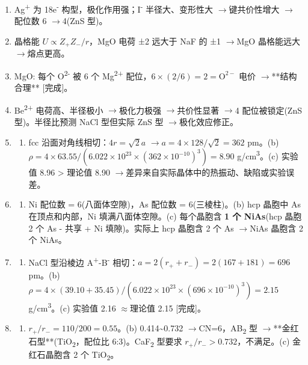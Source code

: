 \documentclass[a4paper,11pt]{ctexart}
\providecommand{\tightlist}{\setlength{\itemsep}{0pt}\setlength{\parskip}{0pt}}
\newcommand{\箭}{\ensuremath{\rightarrow}}
\newcommand{\左箭}{\ensuremath{\leftarrow}}
\newcommand{\上箭}{\ensuremath{\uparrow}}
\newcommand{\下箭}{\ensuremath{\downarrow}}
\newcommand{\衡}{\ensuremath{\rightleftharpoons}}
\newcommand{\双箭}{\ensuremath{\leftrightarrow}}
\newcommand{\约等于}{\ensuremath{\approx}}
\newcommand{\小于等于}{\ensuremath{\leq}}
\newcommand{\大于等于}{\ensuremath{\geq}}
\newcommand{\不等于}{\ensuremath{\neq}}
\newcommand{\西格马}{\ensuremath{\sigma}}
\newcommand{\派}{\ensuremath{\pi}}
\begin{document}
\begin{enumerate}
\item
  Ag\textsuperscript{+} 为 18e\textsuperscript{-} 构型，极化作用强；I\textsuperscript{-} 半径大、变形性大 \箭 键共价性增大 \箭 配位数 6 \箭 4(ZnS 型)。
\item
  晶格能 \(U \propto Z_+Z_-/r\)，MgO 电荷 ±2 远大于 NaF 的 ±1 \箭 MgO 晶格能远大 \箭 熔点更高。
\item
  MgO: 每个 O\textsuperscript{2-} 被 6 个 Mg\textsuperscript{2+} 配位，\(6\times(2/6) = 2 = \mathrm{O^{2-}}\) 电价 \箭 **结构合理** {[}完成{]}。
\item
  Be\textsuperscript{2+} 电荷高、半径极小 \箭 极化力极强 \箭 共价性显著 \箭 4 配位被锁定(ZnS 型)。半径比预测 NaCl 型但实际 ZnS 型 \箭 极化效应修正。
\item
  \begin{enumerate}
  \def\labelenumii{(\alph{enumii})}
  \tightlist
  \item
    fcc 沿面对角线相切：\(4r = \sqrt{2}a\) \箭 \(a = 4\times128/\sqrt{2} = 362\) pm。(b) \(\rho = 4\times63.55/(6.022\times10^{23}\times(362\times10^{-10})^3) = 8.90\) g/cm\textsuperscript{3}。(c) 实验值 8.96 \textgreater{} 理论值 8.90 \箭 差异来自实际晶体中的热振动、缺陷或实验误差。
  \end{enumerate}
\item
  \begin{enumerate}
  \def\labelenumii{(\alph{enumii})}
  \tightlist
  \item
    Ni 配位数 = 6(八面体空隙)，As 配位数 = 6(三棱柱)。(b) hcp 晶胞中 As 在顶点和内部，Ni 填满八面体空隙。(c) 每个晶胞含 \textbf{1 个 NiAs}(hcp 晶胞 2 个 As - 共享 + Ni 填隙)。实际上 hcp 晶胞含 2 个 As \箭 NiAs 晶胞含 2 个 NiAs。
  \end{enumerate}
\item
  \begin{enumerate}
  \def\labelenumii{(\alph{enumii})}
  \tightlist
  \item
    NaCl 型沿棱边 A\textsuperscript{+}-B\textsuperscript{-} 相切：\(a = 2(r_+ + r_-) = 2(167+181) = 696\) pm。(b) \(\rho = 4\times(39.10+35.45)/(6.022\times10^{23}\times(696\times10^{-10})^3) = 2.15\) g/cm\textsuperscript{3}。(c) 实验值 2.16 \约等于 理论值 2.15 {[}完成{]}。
  \end{enumerate}
\item
  \begin{enumerate}
  \def\labelenumii{(\alph{enumii})}
  \tightlist
  \item
    \(r_+/r_- = 110/200 = 0.55\)。(b) 0.414\textasciitilde0.732 \箭 CN=6，AB\textsubscript{2} 型 \箭 **金红石型**(TiO\textsubscript{2}，配位比 6:3)。CaF\textsubscript{2} 型要求 \(r_+/r_->0.732\)，不满足。(c) 金红石晶胞含 2 个 TiO\textsubscript{2}。

\end{enumerate}
\end{enumerate}
\end{document}
